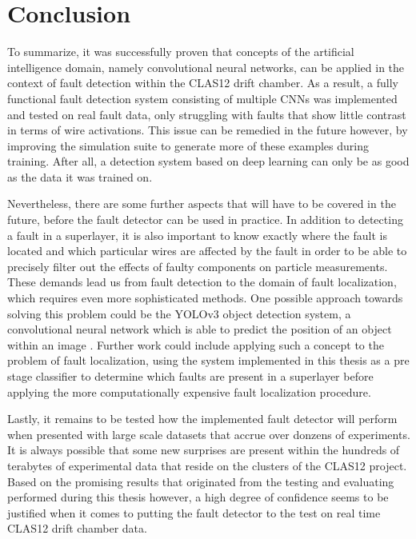 \chapter{Conclusion}

To summarize, it was successfully proven that concepts of the
artificial intelligence domain, namely convolutional neural networks,
can be applied in the context of fault detection within the CLAS12
drift chamber. As a result, a fully functional fault detection system
consisting of multiple CNNs was implemented and tested on real fault
data, only struggling with faults that show little contrast in terms
of wire activations. This issue can be remedied in the future however,
by improving the simulation suite to generate more of these examples
during training. After all, a detection system based on deep learning
can only be as good as the data it was trained on.

Nevertheless, there are some further aspects that will have to be
covered in the future, before the fault detector can be used in
practice. In addition to detecting a fault in a superlayer, it is also
important to know exactly where the fault is located and which
particular wires are affected by the fault in order to be able to
precisely filter out the effects of faulty components on particle
measurements. These demands lead us from fault detection to the
domain of fault localization, which requires even more sophisticated
methods. One possible approach towards solving this problem could be
the YOLOv3 object detection system, a convolutional neural network
which is able to predict the position of an object within an image
\cite{yolo}. Further work could include applying such a concept to the
problem of fault localization, using the system implemented in
this thesis as a pre stage classifier to determine which faults are
present in a superlayer before applying the more computationally
expensive fault localization procedure.

Lastly, it remains to be tested how the implemented fault detector
will perform when presented with large scale datasets that accrue over
donzens of experiments. It is always possible that some new surprises
are present within the hundreds of terabytes of experimental data that
reside on the clusters of the CLAS12 project. Based on the promising
results that originated from the testing and evaluating performed
during this thesis however, a high degree of confidence seems to be
justified when it comes to putting the fault detector to the test on
real time CLAS12 drift chamber data.
